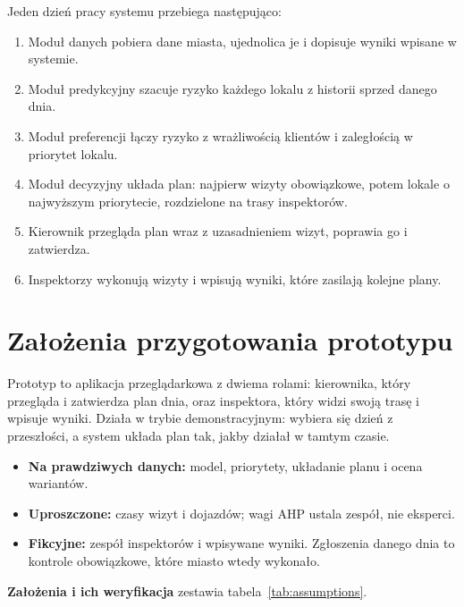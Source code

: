 \documentclass[11pt,a4paper]{article}
\begin{document}
Jeden dzień pracy systemu przebiega następująco:
\begin{enumerate}
  \item Moduł danych pobiera dane miasta, ujednolica je i dopisuje wyniki wpisane w systemie.
  \item Moduł predykcyjny szacuje ryzyko każdego lokalu z historii sprzed danego dnia.
  \item Moduł preferencji łączy ryzyko z wrażliwością klientów i zaległością w priorytet lokalu.
  \item Moduł decyzyjny układa plan: najpierw wizyty obowiązkowe, potem lokale o najwyższym
        priorytecie, rozdzielone na trasy inspektorów.
  \item Kierownik przegląda plan wraz z uzasadnieniem wizyt, poprawia go i zatwierdza.
  \item Inspektorzy wykonują wizyty i wpisują wyniki, które zasilają kolejne plany.
\end{enumerate}

\section{Założenia przygotowania prototypu}

Prototyp to aplikacja przeglądarkowa z dwiema rolami: kierownika, który przegląda
i zatwierdza plan dnia, oraz inspektora, który widzi swoją trasę i wpisuje wyniki. Działa
w trybie demonstracyjnym: wybiera się dzień z przeszłości, a system układa plan tak, jakby
działał w tamtym czasie.
\begin{itemize}
  \item \textbf{Na prawdziwych danych:} model, priorytety, układanie planu i ocena wariantów.
  \item \textbf{Uproszczone:} czasy wizyt i dojazdów; wagi AHP ustala zespół, nie eksperci.
  \item \textbf{Fikcyjne:} zespół inspektorów i wpisywane wyniki. Zgłoszenia danego dnia to
        kontrole obowiązkowe, które miasto wtedy wykonało.
\end{itemize}

\textbf{Założenia i ich weryfikacja} zestawia tabela~\ref{tab:assumptions}.
\end{document}
